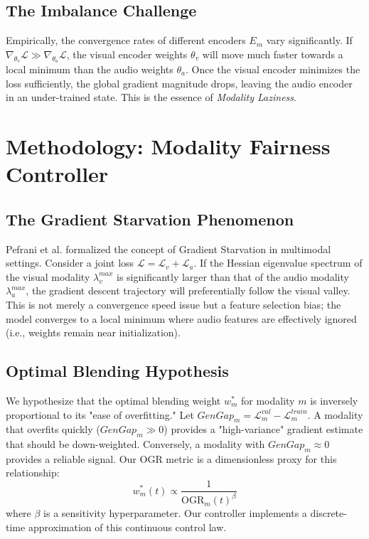 \documentclass[10pt, twocolumn, letterpaper]{article}
\begin{document}
\subsection{The Imbalance Challenge}
Empirically, the convergence rates of different encoders $E_m$ vary significantly. If $\nabla_{\theta_v} \mathcal{L} \gg \nabla_{\theta_a} \mathcal{L}$, the visual encoder weights $\theta_v$ will move much faster towards a local minimum than the audio weights $\theta_a$. Once the visual encoder minimizes the loss sufficiently, the global gradient magnitude drops, leaving the audio encoder in an under-trained state. This is the essence of \textit{Modality Laziness}.

\section{Methodology: Modality Fairness Controller}

\subsection{ The Gradient Starvation Phenomenon}
Pefrani et al. \cite{gradient_starvation} formalized the concept of Gradient Starvation in multimodal settings. Consider a joint loss $\mathcal{L} = \mathcal{L}_v + \mathcal{L}_a$. If the Hessian eigenvalue spectrum of the visual modality $\lambda_v^{max}$ is significantly larger than that of the audio modality $\lambda_a^{max}$, the gradient descent trajectory will preferentially follow the visual valley. This is not merely a convergence speed issue but a feature selection bias; the model converges to a local minimum where audio features are effectively ignored (i.e., weights remain near initialization).

\subsection{Optimal Blending Hypothesis}
We hypothesize that the optimal blending weight $w_m^*$ for modality $m$ is inversely proportional to its "ease of overfitting." Let $GenGap_m = \mathcal{L}^{val}_m - \mathcal{L}^{train}_m$. A modality that overfits quickly ($GenGap_m \gg 0$) provides a "high-variance" gradient estimate that should be down-weighted. Conversely, a modality with $GenGap_m \approx 0$ provides a reliable signal. Our OGR metric is a dimensionless proxy for this relationship:
\begin{equation}
    w_m^*(t) \propto \frac{1}{\text{OGR}_m(t)^\beta}
\end{equation}
where $\beta$ is a sensitivity hyperparameter. Our controller implements a discrete-time approximation of this continuous control law.
\end{document}
